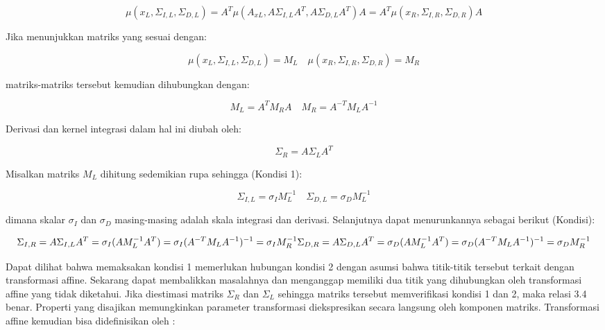 \begin{equation}
  \mu(x_{L},\Sigma_{I,L},\Sigma_{D,L}) = A^{T}\mu(A_{xL},A\Sigma_{I,L}A^{T},A\Sigma_{D,L}A^{T})A = A^{T}\mu(x_{R},\Sigma_{I,R},\Sigma_{D,R})A
\end{equation}

Jika menunjukkan matriks yang sesuai dengan:

\begin{equation*}
  \mu(x_{L},\Sigma_{I,L},\Sigma_{D,L}) = M_{L} \quad \mu(x_{R},\Sigma_{I,R},\Sigma_{D,R}) = M_{R}
\end{equation*}


matriks-matriks tersebut kemudian dihubungkan dengan:

\begin{equation}
  M_{L} = A^{T}M_{R}A \quad M_{R} = A^{-T}M_{L}A^{-1}
\end{equation}

Derivasi dan kernel integrasi dalam hal ini diubah oleh:

\begin{equation*}
  \Sigma_{R} = A\Sigma_{L}A^{T}
\end{equation*}

Misalkan matriks \(M_{L}\) dihitung sedemikian rupa sehingga (Kondisi 1):

\begin{equation}
  \Sigma_{I,L}=\sigma_{I}M_{L}^{-1} \quad \Sigma_{D,L}=\sigma_{D}M_{L}^{-1}
\end{equation}

dimana skalar \(\sigma_{I}\) dan \(\sigma_{D}\) masing-masing adalah skala integrasi dan derivasi. 
Selanjutnya dapat menurunkannya sebagai berikut (Kondisi):

\begin{equation}
  \Sigma_{I,R} = A\Sigma_{I,L}A^{T} = \sigma_{I}(AM_{L}^{-1}A^{T}) = \sigma_{I}(A^{-T}M_{L}A^{-1})^{-1} = \sigma_{I}M_{R}^{-1} \\
  \Sigma_{D,R} = A\Sigma_{D,L}A^{T} = \sigma_{D}(AM_{L}^{-1}A^{T}) = \sigma_{D}(A^{-T}M_{L}A^{-1})^{-1} = \sigma_{D}M_{R}^{-1}
\end{equation}

Dapat dilihat bahwa memaksakan kondisi 1 memerlukan hubungan kondisi 2 dengan asumsi bahwa 
titik-titik tersebut terkait dengan transformasi affine. Sekarang dapat membalikkan masalahnya dan 
menganggap memiliki dua titik yang dihubungkan oleh transformasi affine yang tidak diketahui. 
Jika diestimasi matriks \(\Sigma_{R}\) dan \(\Sigma_{L}\) sehingga matriks tersebut memverifikasi 
kondisi 1 dan 2, maka relasi 3.4 benar. Properti yang disajikan memungkinkan parameter transformasi 
diekspresikan secara langsung oleh komponen matriks. Transformasi affine kemudian bisa didefinisikan oleh :

